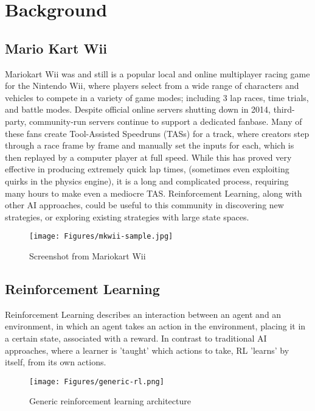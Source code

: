 
\chapter{Background}
\section{Mario Kart Wii}
Mariokart Wii was and still is a popular local and online multiplayer racing game for the Nintendo Wii, where players select from a wide range of characters and vehicles to compete in a variety of game modes; including 3 lap races, time trials, and battle modes. Despite official online servers shutting down in 2014, third-party, community-run servers continue to support a dedicated fanbase. Many of these fans create Tool-Assisted Speedruns (TASs) for a track, where creators step through a race frame by frame and manually set the inputs for each, which is then replayed by a computer player at full speed. While this has proved very effective in producing extremely quick lap times, (sometimes even exploiting quirks in the physics engine), it is a long and complicated process, requiring many hours to make even a mediocre TAS. Reinforcement Learning, along with other AI approaches, could be useful to this community in discovering new strategies, or exploring existing strategies with large state spaces.
\begin{figure}
    \centering
    \texttt{[image: Figures/mkwii-sample.jpg]}
    \caption{Screenshot from Mariokart Wii}
    \label{fig:mariokart-standard}
\end{figure}
\section{Reinforcement Learning}
Reinforcement Learning describes an interaction between an agent and an environment, in which an agent takes an action in the environment, placing it in a certain state, associated with a reward. In contrast to traditional AI approaches, where a learner is 'taught' which actions to take, RL 'learns' by itself, from its own actions.
\begin{figure}[htb]
    \centering
    \texttt{[image: Figures/generic-rl.png]}
    \caption{Generic reinforcement learning architecture\cite{sutton2018reinforcement}} %
    \label{fig:q-learning-generic}
\end{figure}
